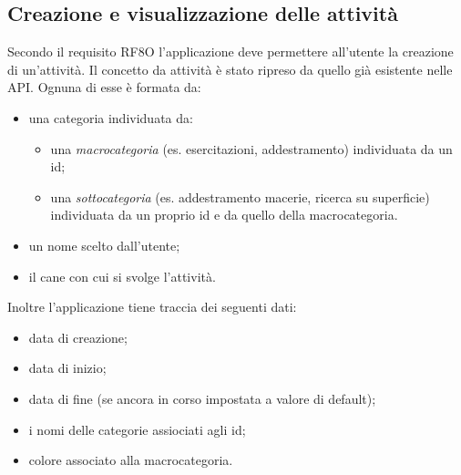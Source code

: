 \subsection{Creazione e visualizzazione delle attività}
Secondo il requisito RF8O l'applicazione deve permettere all'utente la creazione di un'attività. Il concetto da attività è stato ripreso da
quello già esistente nelle API. Ognuna di esse è formata da:
\begin{itemize}
  \item una categoria individuata da: 
  \begin{itemize}
    \item una \textit{macrocategoria} (es. esercitazioni, addestramento) individuata da un id;
    \item una \textit{sottocategoria} (es. addestramento macerie, ricerca su superficie) individuata da un proprio id e da quello della macrocategoria.
  \end{itemize}
  \item un nome scelto dall'utente;
  \item il cane con cui si svolge l'attività.
\end{itemize}
Inoltre l'applicazione tiene traccia dei seguenti dati:
\begin{itemize}
  \item data di creazione;
  \item data di inizio;
  \item data di fine (se ancora in corso impostata a valore di default);
  \item i nomi delle categorie assiociati agli id;
  \item colore associato alla macrocategoria.
\end{itemize}

